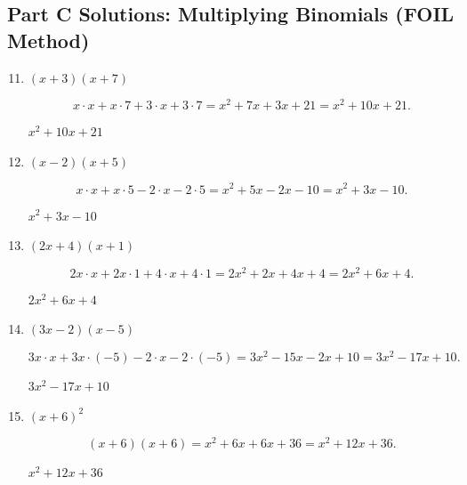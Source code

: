 \documentclass[14pt]{extarticle}
\begin{document}
\subsection*{Part C Solutions: Multiplying Binomials (FOIL Method)}
\begin{enumerate}
  \setcounter{enumi}{10}
  \item \((x + 3)(x + 7)\)

  \[
  x\cdot x + x \cdot 7 + 3 \cdot x + 3 \cdot 7
  = x^2 + 7x + 3x + 21
  = x^2 + 10x + 21.
  \]

  \(\boxed{x^2 + 10x + 21}\)

  \item \((x - 2)(x + 5)\)

  \[
  x \cdot x + x \cdot 5 - 2 \cdot x - 2 \cdot 5
  = x^2 + 5x - 2x - 10
  = x^2 + 3x - 10.
  \]

  \(\boxed{x^2 + 3x - 10}\)

  \item \((2x + 4)(x + 1)\)

  \[
  2x \cdot x + 2x \cdot 1 + 4 \cdot x + 4 \cdot 1
  = 2x^2 + 2x + 4x + 4
  = 2x^2 + 6x + 4.
  \]

  \(\boxed{2x^2 + 6x + 4}\)

  \item \((3x - 2)(x - 5)\)

  \[
  3x \cdot x + 3x \cdot (-5) - 2 \cdot x - 2 \cdot (-5)
  = 3x^2 - 15x - 2x + 10
  = 3x^2 - 17x + 10.
  \]

  \(\boxed{3x^2 - 17x + 10}\)

  \item \((x + 6)^2\)

  \[
  (x + 6)(x + 6)
  = x^2 + 6x + 6x + 36
  = x^2 + 12x + 36.
  \]

  \(\boxed{x^2 + 12x + 36}\)
\end{enumerate}
\end{document}
